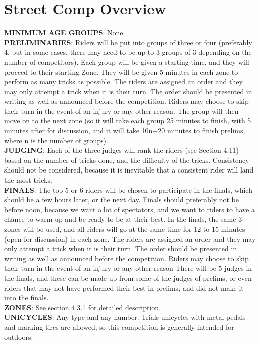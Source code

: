 \section{Street Comp Overview}
\textbf{MINIMUM AGE GROUPS}: None.\\
\textbf{PRELIMINARIES}: Riders will be put into groups of three or four (preferably 4, but in some cases, there may need to be up to 3 groups of 3 depending on the number of competitors). Each group will be given a starting time, and they will proceed to their starting Zone. They will be given 5 minutes in each zone to perform as many tricks as possible. The riders are assigned an order and they may only attempt a trick when it is their turn. The order should be presented in writing as well as announced before the competition. Riders may choose to skip their turn in the event of an injury or any other reason. The group will then move on to the next zone (so it will take each group 25 minutes to finish, with 5 minutes after for discussion, and it will take 10n+20 minutes to finish prelims, where n is the number of groups). \\
\textbf{JUDGING}: Each of the three judges will rank the riders (see Section 4.11) based on the number of tricks done, and the difficulty of the tricks. Consistency should not be considered, because it is inevitable that a consistent rider will land the most tricks.\\
\textbf{FINALS}: The top 5 or 6 riders will be chosen to participate in the finals, which should be a few hours later, or the next day. Finals should preferably not be before noon, because we want a lot of spectators, and we want to riders to have a chance to warm up and be ready to be at their best. In the finals, the same 3 zones will be used, and all riders will go at the same time for 12 to 15 minutes (open for discussion) in each zone. The riders are assigned an order and they may only attempt a trick when it is their turn. The order should be presented in writing as well as announced before the competition. Riders may choose to skip their turn in the event of an injury or any other reason There will be 5 judges in the finals, and these can be made up from some of the judges of prelims, or even riders that may not have performed their best in prelims, and did not make it into the finals.\\
\textbf{ZONES}: See section 4.3.1 for detailed description.\\
\textbf{UNICYCLES}: Any type and any number. Trials unicycles with metal pedals and marking tires are allowed, so this competition is generally intended for outdoors. \\
